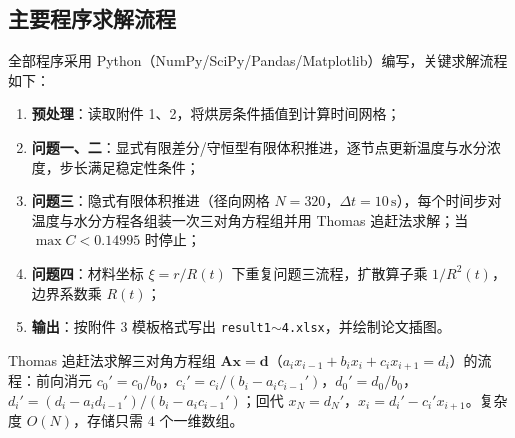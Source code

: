 \documentclass[withoutpreface,bwprint]{cumcmthesis} %
\begin{document}
\begin{appendices}
\section{主要程序求解流程}

全部程序采用 Python（NumPy/SciPy/Pandas/Matplotlib）编写，关键求解流程如下：

\begin{enumerate}
\item \textbf{预处理}：读取附件 1、2，将烘房条件插值到计算时间网格；
\item \textbf{问题一、二}：显式有限差分/守恒型有限体积推进，逐节点更新温度与水分浓度，步长满足稳定性条件；
\item \textbf{问题三}：隐式有限体积推进（径向网格 $N=320$，$\Delta t=10\,\mathrm{s}$），每个时间步对温度与水分方程各组装一次三对角方程组并用 Thomas 追赶法求解；当 $\max C<0.14995$ 时停止；
\item \textbf{问题四}：材料坐标 $\xi=r/R(t)$ 下重复问题三流程，扩散算子乘 $1/R^2(t)$，边界系数乘 $R(t)$；
\item \textbf{输出}：按附件 3 模板格式写出 \texttt{result1$\sim$4.xlsx}，并绘制论文插图。
\end{enumerate}

Thomas 追赶法求解三对角方程组 $\bm{A}\bm{x}=\bm{d}$（$a_i x_{i-1}+b_i x_i+c_i x_{i+1}=d_i$）的流程：前向消元 $c_0'=c_0/b_0$，$c_i'=c_i/(b_i-a_i c_{i-1}')$，$d_0'=d_0/b_0$，$d_i'=(d_i-a_i d_{i-1}')/(b_i-a_i c_{i-1}')$；回代 $x_N=d_N'$，$x_i=d_i'-c_i' x_{i+1}$。复杂度 $O(N)$，存储只需 4 个一维数组。



\end{appendices}
\end{document}
